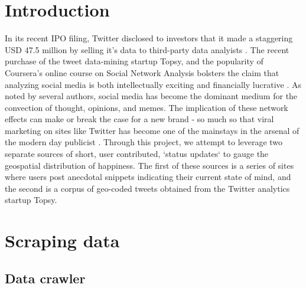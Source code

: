 \documentclass[11pt, letterpaper, conference, final, twocolumn]{ieeeconf}
\begin{document}
\section{Introduction}
\label{sec:intro}
In its recent IPO filing, Twitter disclosed to investors that it made a
staggering USD 47.5 million by selling it's data to third-party data analyists
\cite{wsj_twitter}. The recent purchase of the tweet data-mining startup Topsy,
and the popularity of Coursera's online course on Social Network Analysis
bolsters the claim that analyzing social media is both intellectually exciting
and financially lucrative \cite{russell2011mining}. As noted by several
authors,\cite{ediger2010massive} social media has become the dominant medium
for the convection of thought, opinions, and memes. The implication of these
network effects can make or break the case for a new brand - so much so that
viral marketing on sites like Twitter has become one of the mainstays in the
arsenal of the modern day publicist \cite{richardson2002mining}. Through this
project, we attempt to leverage two separate sources of short, user
contributed, `status updates` to gauge the geospatial distribution of
happiness. The first of these sources is a series of sites where users post
anecdotal snippets indicating their current state of mind, and the second is a
corpus of geo-coded tweets obtained from the Twitter analytics startup Topsy.



\section{Scraping data}
\label{sec:data}

\subsection{Data crawler}
\label{ssec:crawler}
\end{document}
